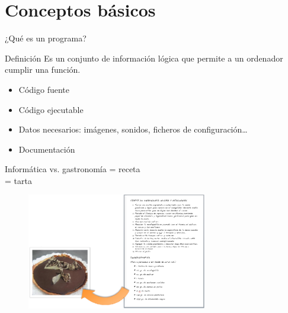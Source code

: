 \documentclass{beamer}
\begin{document}

\section{Conceptos básicos}


\begin{frame}{¿Qué es un programa?}
  \begin{block}{Definición}
    Es un conjunto de información lógica que permite a un ordenador cumplir una función.
  \end{block}

  \begin{itemize}
  \item Código fuente
  \item Código ejecutable
  \item Datos necesarios: imágenes, sonidos, ficheros de         configuración\ldots
  \item Documentación 
  \end{itemize}

\end{frame}

\begin{frame}
  \begin{exampleblock}{Informática vs. gastronomía}
    \centering 
     = receta \\  = tarta
  \end{exampleblock}

  \begin{figure}
    \centering
    \includegraphics[width=0.7\textwidth]{pics/receta.png}
  \end{figure}
  
\end{frame}
\end{document}
